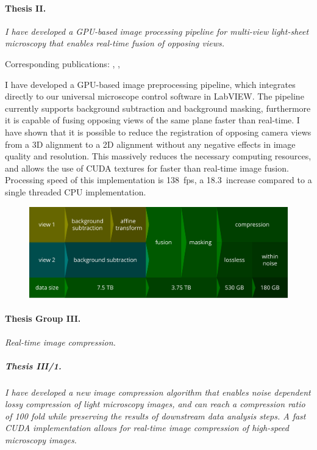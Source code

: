 \documentclass{booklet_style}
\begin{document}
\paragraph{Thesis II.} \textit{I have developed a GPU-based image processing pipeline for multi-view light-sheet microscopy that enables real-time fusion of opposing views.}

Corresponding publications: \cite{balazs_gpu-based_2016}, \cite{balazs_gpu-based_2016-1}, \cite{balazs_gpu-based_2017}

I have developed a GPU-based image preprocessing pipeline, which integrates directly to our universal microscope control software in LabVIEW. The pipeline currently supports background subtraction and background masking, furthermore it is capable of fusing opposing views of the same plane faster than real-time. I have shown that it is possible to reduce the registration of opposing camera views from a 3D alignment to a 2D alignment without any negative effects in image quality and resolution. This massively reduces the necessary computing resources, and allows the use of CUDA textures for faster than real-time image fusion. Processing speed of this implementation is \SI{138}{fps}, a 18.3\texttimes\ increase compared to a single threaded CPU implementation.


\begin{figure}
  \centering
  \includegraphics[width=\textwidth]{4_gpu/pipeline}
  \label{fig:pipeline}
\end{figure}


\paragraph{Thesis Group III.} \textit{Real-time image compression.}
\subparagraph{Thesis III/1.}
\textit{I have  developed a new image compression algorithm that enables noise dependent lossy compression of light microscopy images, and can reach a compression ratio of 100 fold while preserving the results of downstream data analysis steps. A fast CUDA implementation allows for real-time image compression of high-speed microscopy images.}
\end{document}
